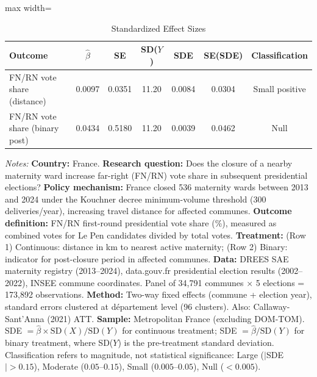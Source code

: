 \begin{table}[htbp]
\centering
\caption{Standardized Effect Sizes}
\label{tab:sde}
\begin{adjustbox}{max width=\textwidth}
\begin{tabular}{lcccccc}
\toprule
Outcome & $\hat{\beta}$ & SE & SD($Y$) & SDE & SE(SDE) & Classification \\
\midrule
FN/RN vote share (distance) & 0.0097 & 0.0351 & 11.20 & 0.0084 & 0.0304 & Small positive \\
FN/RN vote share (binary post) & 0.0434 & 0.5180 & 11.20 & 0.0039 & 0.0462 & Null \\
\bottomrule
\end{tabular}
\end{adjustbox}
\begin{tablenotes}[flushleft]
\small
\item \textit{Notes:} \textbf{Country:} France. \textbf{Research question:} Does the closure of a nearby maternity ward increase far-right (FN/RN) vote share in subsequent presidential elections? \textbf{Policy mechanism:} France closed 536 maternity wards between 2013 and 2024 under the Kouchner decree minimum-volume threshold (300 deliveries/year), increasing travel distance for affected communes. \textbf{Outcome definition:} FN/RN first-round presidential vote share (\%), measured as combined votes for Le Pen candidates divided by total votes. \textbf{Treatment:} (Row 1) Continuous: distance in km to nearest active maternity; (Row 2) Binary: indicator for post-closure period in affected communes. \textbf{Data:} DREES SAE maternity registry (2013--2024), data.gouv.fr presidential election results (2002--2022), INSEE commune coordinates. Panel of 34,791 communes $\times$ 5 elections = 173,892 observations. \textbf{Method:} Two-way fixed effects (commune + election year), standard errors clustered at d\'{e}partement level (96 clusters). Also: Callaway-Sant'Anna (2021) ATT. \textbf{Sample:} Metropolitan France (excluding DOM-TOM). SDE $= \hat{\beta} \times \text{SD}(X) / \text{SD}(Y)$ for continuous treatment; SDE $= \hat{\beta} / \text{SD}(Y)$ for binary treatment, where SD($Y$) is the pre-treatment standard deviation. Classification refers to magnitude, not statistical significance: Large ($|$SDE$| > 0.15$), Moderate ($0.05$--$0.15$), Small ($0.005$--$0.05$), Null ($< 0.005$).
\end{tablenotes}
\end{table}

